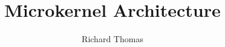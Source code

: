 \documentclass{csse4400}
\title{Microkernel Architecture}
\author{Richard Thomas}
\date{\week{3}}
\begin{document}
\makecover



% 
% 
\end{document}
